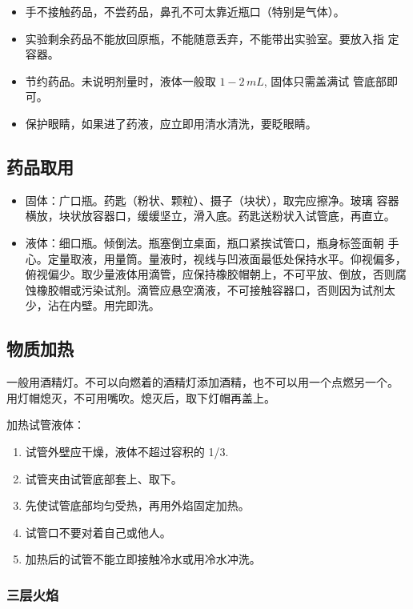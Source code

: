 \begin{itemize}
\item 手不接触药品，不尝药品，鼻孔不可太靠近瓶口（特别是气体）。
\item 实验剩余药品不能放回原瓶，不能随意丢弃，不能带出实验室。要放入指
  定容器。
\item 节约药品。未说明剂量时，液体一般取 $1 - 2 \, mL$, 固体只需盖满试
  管底部即可。
\item 保护眼睛，如果进了药液，应立即用清水清洗，要眨眼睛。
\end{itemize}

\subsection{药品取用}

\begin{itemize}
\item 固体：广口瓶。药匙（粉状、颗粒）、摄子（块状），取完应擦净。玻璃
  容器横放，块状放容器口，缓缓坚立，滑入底。药匙送粉状入试管底，再直立。
\item 液体：细口瓶。倾倒法。瓶塞倒立桌面，瓶口紧挨试管口，瓶身标签面朝
  手心。定量取液，用量筒。量液时，视线与凹液面最低处保持水平。仰视偏多，
  俯视偏少。取少量液体用滴管，应保持橡胶帽朝上，不可平放、倒放，否则腐
  蚀橡胶帽或污染试剂。滴管应悬空滴液，不可接触容器口，否则因为试剂太
  少，沾在内壁。用完即洗。
\end{itemize}

\subsection{物质加热}

一般用酒精灯。不可以向燃着的酒精灯添加酒精，也不可以用一个点燃另一个。
用灯帽熄灭，不可用嘴吹。熄灭后，取下灯帽再盖上。

加热试管液体：

\begin{enumerate}
\item 试管外壁应干燥，液体不超过容积的 1/3.
\item 试管夹由试管底部套上、取下。
\item 先使试管底部均匀受热，再用外焰固定加热。
\item 试管口不要对着自己或他人。
\item 加热后的试管不能立即接触冷水或用冷水冲洗。
\end{enumerate}

\subsubsection{三层火焰}

